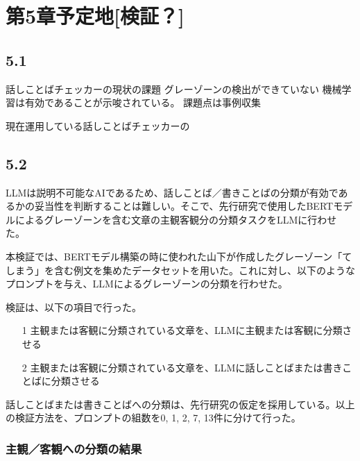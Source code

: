 \chapter{第5章予定地[検証？] \label{c5}}

\section{5.1 \label{c5s1}}
話しことばチェッカーの現状の課題
グレーゾーンの検出ができていない
機械学習は有効であることが示唆されている。
課題点は事例収集

現在運用している話しことばチェッカーの



\section{5.2 \label{c5s2}}
LLMは説明不可能なAIであるため、話しことば／書きことばの分類が有効であるかの妥当性を判断することは難しい。そこで、先行研究で使用したBERTモデルによるグレーゾーンを含む文章の主観客観分の分類タスクをLLMに行わせた。

本検証では、BERTモデル構築の時に使われた山下が作成したグレーゾーン「てしまう」を含む例文を集めたデータセットを用いた。これに対し、以下のようなプロンプトを与え、LLMによるグレーゾーンの分類を行わせた。





検証は、以下の項目で行った。
\begin{itemize}
    \item[1] 主観または客観に分類されている文章を、LLMに主観または客観に分類させる
    \item[2] 主観または客観に分類されている文章を、LLMに話しことばまたは書きことばに分類させる
\end{itemize}
話しことばまたは書きことばへの分類は、先行研究の仮定を採用している。以上の検証方法を、プロンプトの組数を0, 1, 2, 7, 13件に分けて行った。

\subsection{主観／客観への分類の結果}


